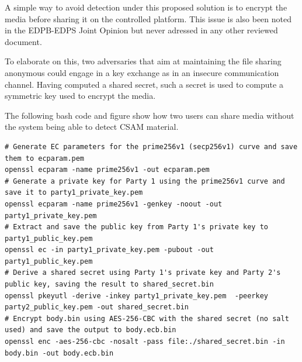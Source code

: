 A simple way to avoid detection under this proposed solution is to encrypt the media before sharing it on the controlled platform. This issue is also been noted in the EDPB-EDPS Joint Opinion\cite{Joint} but never adressed in any other reviewed document.

To elaborate on this, two adversaries that aim at maintaining the file sharing anonymous could engage in a key exchange as in an insecure communication channel. Having computed a shared secret, such a secret is used to compute a symmetric key used to encrypt the media.

The following bash code and figure show how two users can share media without the system being able to detect CSAM material.
\\
\begin{minipage}{0.5\textwidth}


    \begin{lstlisting}
# Generate EC parameters for the prime256v1 (secp256v1) curve and save them to ecparam.pem
openssl ecparam -name prime256v1 -out ecparam.pem
# Generate a private key for Party 1 using the prime256v1 curve and save it to party1_private_key.pem
openssl ecparam -name prime256v1 -genkey -noout -out party1_private_key.pem
# Extract and save the public key from Party 1's private key to party1_public_key.pem
openssl ec -in party1_private_key.pem -pubout -out party1_public_key.pem
# Derive a shared secret using Party 1's private key and Party 2's public key, saving the result to shared_secret.bin
openssl pkeyutl -derive -inkey party1_private_key.pem  -peerkey party2_public_key.pem -out shared_secret.bin
# Encrypt body.bin using AES-256-CBC with the shared secret (no salt used) and save the output to body.ecb.bin
openssl enc -aes-256-cbc -nosalt -pass file:./shared_secret.bin -in body.bin -out body.ecb.bin
    \end{lstlisting}
\end{minipage}%
\hfill
